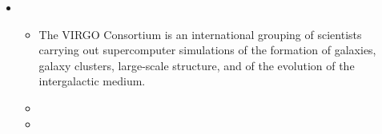 \documentclass[letterpaper,10pt,english]{sphinxmanual}
\begin{document}
\begin{itemize}
\begin{itemize}
\begin{itemize}
\end{itemize}

\end{itemize}

\item {} 
\begin{itemize}
\item {} 
The VIRGO Consortium is an international grouping of scientists
carrying out supercomputer simulations of the formation of
galaxies, galaxy clusters, large-scale structure, and of the
evolution of the intergalactic medium.

\item {} 

\item {} 

\end{itemize}

\end{itemize}
\end{document}
